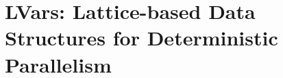 \chapter{LVars: Lattice-based Data Structures for Deterministic Parallelism\label{ch:lvars}} %


















